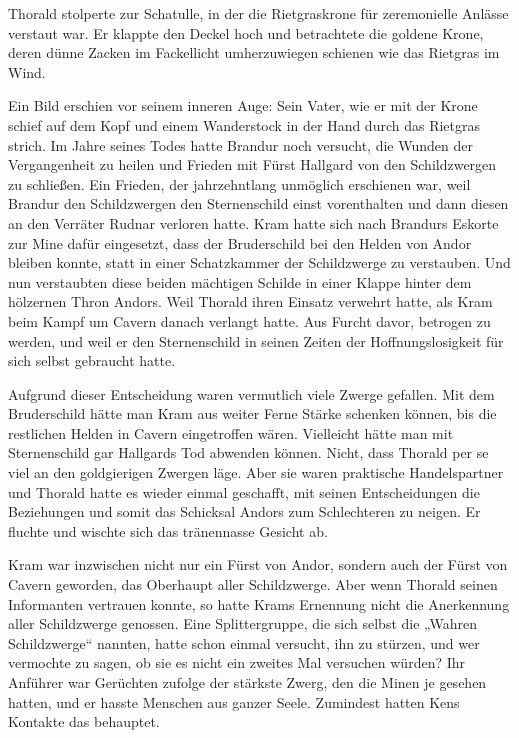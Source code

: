 Thorald stolperte zur Schatulle, in der die Rietgraskrone für zeremonielle Anlässe verstaut war. Er klappte den Deckel hoch und betrachtete die goldene Krone, deren dünne Zacken im Fackellicht umherzuwiegen schienen wie das Rietgras im Wind.

Ein Bild erschien vor seinem inneren Auge: Sein Vater, wie er mit der Krone schief auf dem Kopf und einem Wanderstock in der Hand durch das Rietgras strich. Im Jahre seines Todes hatte Brandur noch versucht, die Wunden der Vergangenheit zu heilen und Frieden mit Fürst Hallgard von den Schildzwergen zu schließen. Ein Frieden, der jahrzehntlang unmöglich erschienen war, weil Brandur den Schildzwergen den Sternenschild einst vorenthalten und dann diesen an den Verräter Rudnar verloren hatte. Kram hatte sich nach Brandurs Eskorte zur Mine dafür eingesetzt, dass der Bruderschild bei den Helden von Andor bleiben konnte, statt in einer Schatzkammer der Schildzwerge zu verstauben. Und nun verstaubten diese beiden mächtigen Schilde in einer Klappe hinter dem hölzernen Thron Andors. Weil Thorald ihren Einsatz verwehrt hatte, als Kram beim Kampf um Cavern danach verlangt hatte. Aus Furcht davor, betrogen zu werden, und weil er den Sternenschild in seinen Zeiten der Hoffnungslosigkeit für sich selbst gebraucht hatte.

Aufgrund dieser Entscheidung waren vermutlich viele Zwerge gefallen. Mit dem Bruderschild hätte man Kram aus weiter Ferne Stärke schenken können, bis die restlichen Helden in Cavern eingetroffen wären. Vielleicht hätte man mit Sternenschild gar Hallgards Tod abwenden können. Nicht, dass Thorald per se viel an den goldgierigen Zwergen läge. Aber sie waren praktische Handelspartner und Thorald hatte es wieder einmal geschafft, mit seinen Entscheidungen die Beziehungen und somit das Schicksal Andors zum Schlechteren zu neigen. Er fluchte und wischte sich das tränennasse Gesicht ab.

Kram war inzwischen nicht nur ein Fürst von Andor, sondern auch der Fürst von Cavern geworden, das Oberhaupt aller Schildzwerge. Aber wenn Thorald seinen Informanten vertrauen konnte, so hatte Krams Ernennung nicht die Anerkennung aller Schildzwerge genossen. Eine Splittergruppe, die sich selbst die „Wahren Schildzwerge“ nannten, hatte schon einmal versucht, ihn zu stürzen, und wer vermochte zu sagen, ob sie es nicht ein zweites Mal versuchen würden? Ihr Anführer war Gerüchten zufolge der stärkste Zwerg, den die Minen je gesehen hatten, und er hasste Menschen aus ganzer Seele. Zumindest hatten Kens Kontakte das behauptet.

